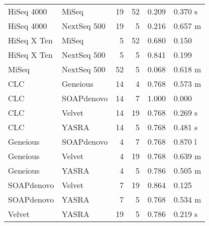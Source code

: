 \begin{table}[ht]
\begin{tabular}{llrrll}
  HiSeq 4000 & MiSeq &   19 &   52 & 0.209 & 0.370 s \\ 
  HiSeq 4000 & NextSeq 500 &   19 &    5 & 0.216 & 0.657 m \\ 
  HiSeq X Ten & MiSeq &    5 &   52 & 0.680 & 0.150 \\ 
  HiSeq X Ten & NextSeq 500 &    5 &    5 & 0.841 & 0.199 \\ 
  MiSeq & NextSeq 500 &   52 &    5 & 0.068 & 0.618 m \\ 
  CLC & Geneious &   14 &    4 & 0.768 & 0.573 m \\ 
  CLC & SOAPdenovo &   14 &    7 & 1.000 & 0.000 \\ 
  CLC & Velvet &   14 &   19 & 0.768 & 0.269 s \\ 
  CLC & YASRA &   14 &    5 & 0.768 & 0.481 s \\ 
  Geneious & SOAPdenovo &    4 &    7 & 0.768 & 0.870 l \\ 
  Geneious & Velvet &    4 &   19 & 0.768 & 0.639 m \\ 
  Geneious & YASRA &    4 &    5 & 0.786 & 0.505 m \\ 
  SOAPdenovo & Velvet &    7 &   19 & 0.864 & 0.125 \\ 
  SOAPdenovo & YASRA &    7 &    5 & 0.768 & 0.534 m \\ 
  Velvet & YASRA &   19 &    5 & 0.786 & 0.219 s \\ 
   \hline
\end{tabular}
\end{table}
